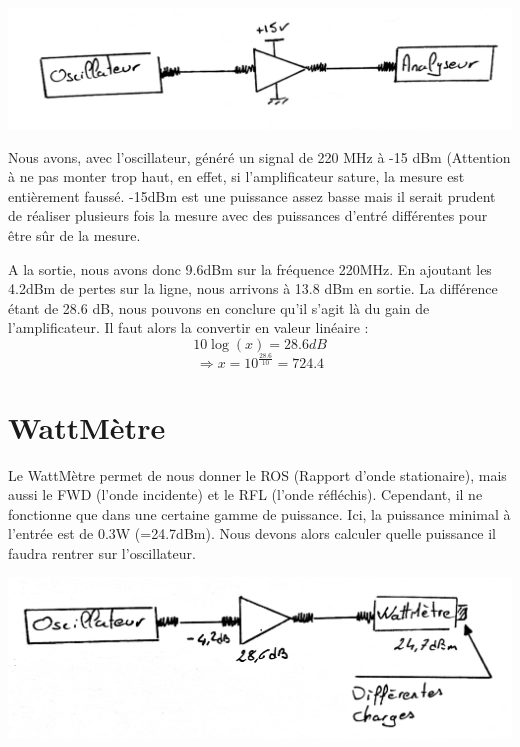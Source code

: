 \documentclass[a4paper,12pt]{report}            %
\begin{document}
\begin{center}\includegraphics[scale = 0.3]{pic/montage_ampli.png}\\ \end{center}

Nous avons, avec l'oscillateur, généré un signal de 220 MHz à -15 dBm (Attention à ne pas monter trop haut, en 
effet, si l'amplificateur sature, la mesure est entièrement faussé. -15dBm est une puissance assez basse mais il
serait prudent de réaliser plusieurs fois la mesure avec des puissances d'entré différentes pour être sûr de 
la mesure.

A la sortie, nous avons donc 9.6dBm sur la fréquence 220MHz. En ajoutant les 4.2dBm de pertes sur la ligne, nous arrivons
à 13.8 dBm en sortie. La différence étant de 28.6 dB, nous pouvons en conclure qu'il s'agit là du gain de l'amplificateur.
Il faut alors la convertir en valeur linéaire :\\
$$10 \log (x) = 28.6 dB$$
$$\Rightarrow x = 10^{\frac{28.6}{10}}=724.4 $$

\chapter{WattMètre}

Le WattMètre permet de nous donner le ROS (Rapport d'onde stationaire), mais aussi le FWD (l'onde incidente) et le
RFL (l'onde réfléchis). Cependant, il ne fonctionne que dans une certaine gamme de puissance. Ici, la puissance minimal
à l'entrée est de 0.3W (=24.7dBm). Nous devons alors calculer quelle puissance il faudra rentrer sur l'oscillateur.

\begin{center}\includegraphics[scale = 0.25]{pic/montage_wattmetre.png}\\ \end{center}
\end{document}

